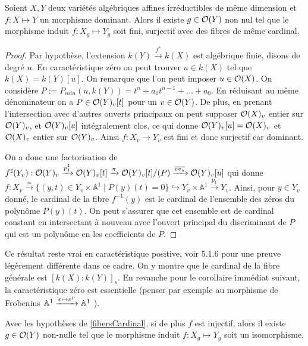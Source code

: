 \begin{prop}\label{fibersCardinal}
Soient $X,Y$ deux variétés algébriques affines irréductibles de même dimension et $f:X \mapsto Y$ un morphisme dominant. Alors il existe $g\in \mathcal{O}(Y)$ non nul tel que le morphisme induit $f:X_g \mapsto Y_g$ soit fini, surjectif avec des fibres de même cardinal.
\end{prop}
\begin{proof}
Par hypothèse, l'extension $k(Y) \xrightarrow{f^*} k(X)$ est algébrique finie, disons de degré $n$. En caractéristique zéro on peut trouver $u\in k(X)$ tel que $k(X)=k(Y)[u]$. On remarque que l'on peut imposer $u\in \mathcal{O}(X)$. On considère $P:=P_{min}(u, k(Y))=t^n+a_1t^{n-1}+...+a_0$. En réduisant au même dénominateur on a $P\in \mathcal{O}(Y)_v[t]$ pour un $v\in \mathcal{O}(Y)$. De plus, en prenant l'intersection avec d'autres ouverts principaux on peut supposer $\mathcal{O}(X)_v$ entier sur $\mathcal{O}(Y)_v$, et $\mathcal{O}(Y)_v[u]$ intégralement clos, ce qui donne $\mathcal{O}(Y)_v[u]=\mathcal{O}(X)_v$ et $\mathcal{O}(X)_v$ entier sur $\mathcal{O}(Y)_v$. Ainsi $f:X_v \rightarrow Y_v$ est fini et donc surjectif car dominant.

On a donc une factorisation de $f^\sharp(Y_v):\mathcal{O}(Y)_v\xrightarrow{p_1^\sharp}\mathcal{O}(Y)_v[t]\xrightarrow{\pi}\mathcal{O}(Y)_v[t]/(P)\xrightarrow{\overline{ev_u}}\mathcal{O}(Y)_v[u]$ qui donne $f:X_v \xrightarrow{\simeq} \lbrace (y,t) \in Y_v\times \mathbb{A}^1\mid P(y)(t)=0\rbrace \hookrightarrow Y_v\times \mathbb{A}^1 \xrightarrow{p_1} Y_v$. Ainsi, pour $y\in Y_v$ donné, le cardinal de la fibre $f^{-1}(y)$ est le cardinal de l'ensemble des zéros du polynôme $P(y)(t)$. On peut s'assurer que cet ensemble est de cardinal constant en intersectant à nouveau avec l'ouvert principal du discriminant de $P$ qui est un polynôme en les coefficients de $P$.
\end{proof}

Ce résultat reste vrai en caractéristique positive, voir \cite{LAGSpringer} 5.1.6 pour une preuve légèrement différente dans ce cadre. On y montre que le cardinal de la fibre générale est $[k(X):k(Y)]_s$. En revanche pour le corollaire immédiat suivant, la caractéristique zéro est essentielle (penser par exemple au morphisme de Frobenius $\mathbb{A}^1 \xrightarrow{x \mapsto x^p} \mathbb{A}^1$ ). 

\begin{cor}\label{injectiveBirationel}
Avec les hypothèses de \ref{fibersCardinal}, si de plus $f$ est injectif, alors il existe $g\in \mathcal{O}(Y)$ non-nulle tel que le morphisme induit $f:X_g \mapsto Y_g$ soit un isomorphisme.
\end{cor}

